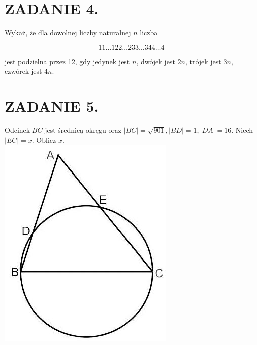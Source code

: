 \documentclass[10pt]{article}
\begin{document}
\section*{ZADANIE 4.}
Wykaż, że dla dowolnej liczby naturalnej \(n\) liczba

\[
11 \ldots 122 \ldots 233 \ldots 344 \ldots 4
\]

jest podzielna przez 12, gdy jedynek jest \(n\), dwójek jest \(2 n\), trójek jest \(3 n\), czwórek jest \(4 n\).

\section*{ZADANIE 5.}
Odcinek \(B C\) jest średnicą okręgu oraz \(|B C|=\sqrt{901},|B D|=1,|D A|=16\). Niech \(|E C|=x\). Oblicz \(x\).\\
\includegraphics[max width=\textwidth, center]{2024_11_21_dc6490e81fa2cf87933ag-1(1)}
\end{document}
